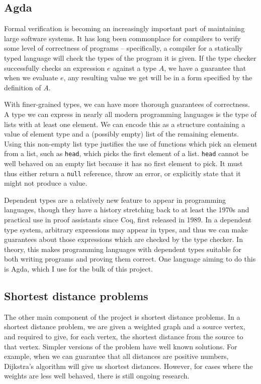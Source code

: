 \subsection{Agda}
Formal verification is becoming an increasingly important part of maintaining large software systems.
It has long been commonplace for compilers to verify some level of correctness of programs -- specifically, a compiler for a statically typed language will check the types of the program it is given.
If the type checker successfully checks an expression $e$ against a type $A$, we have a guarantee that when we evaluate $e$, any resulting value we get will be in a form specified by the definition of $A$.

With finer-grained types, we can have more thorough guarantees of correctness.
A type we can express in nearly all modern programming languages is the type of lists with at least one element.
We can encode this as a structure containing a value of element type and a (possibly empty) list of the remaining elements.
Using this non-empty list type justifies the use of functions which pick an element from a list, such as \texttt{head}, which picks the first element of a list.
\texttt{head} cannot be well behaved on an empty list because it has no first element to pick.
It must thus either return a \texttt{null} reference, throw an error, or explicitly state that it might not produce a value.

Dependent types are a relatively new feature to appear in programming languages, though they have a history stretching back to at least the 1970s\cite{martin-lof:aitot} and practical use in proof assistants since Coq\cite{CoqProofAssistant}, first released in 1989.
In a dependent type system, arbitrary expressions may appear in types, and thus we can make guarantees about those expressions which are checked by the type checker.
In theory, this makes programming languages with dependent types suitable for both writing programs and proving them correct.
One language aiming to do this is Agda\cite{Norell07}, which I use for the bulk of this project.

\subsection{Shortest distance problems}
The other main component of the project is shortest distance problems.
In a shortest distance problem, we are given a weighted graph and a source vertex, and required to give, for each vertex, the shortest distance from the source to that vertex.
Simpler versions of the problem have well known solutions.
For example, when we can guarantee that all distances are positive numbers, Dijkstra's algorithm will give us shortest distances.
However, for cases where the weights are less well behaved, there is still ongoing research.

